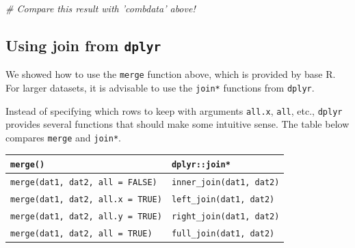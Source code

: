 \documentclass[]{book}
\newenvironment{Shaded}{\begin{snugshade}}{\end{snugshade}}
\newcommand{\CommentTok}[1]{\textcolor[rgb]{0.56,0.35,0.01}{\textit{#1}}}
\begin{document}
\begin{Shaded}
\begin{Highlighting}[]
\CommentTok{# Compare this result with 'combdata' above!}
\end{Highlighting}
\end{Shaded}

\hypertarget{using-join-from-dplyr}{%
\subsection{\texorpdfstring{Using join from \texttt{dplyr}}{Using join from dplyr}}\label{using-join-from-dplyr}}

We showed how to use the \texttt{merge} function above, which is provided by base R. For larger datasets, it is advisable to use the \texttt{join*} functions from \texttt{dplyr}.

Instead of specifying which rows to keep with arguments \texttt{all.x}, \texttt{all}, etc., \texttt{dplyr} provides several functions that should make some intuitive sense. The table below compares \texttt{merge} and \texttt{join*}.

\begin{longtable}[]{@{}ll@{}}
\toprule
\begin{minipage}[b]{0.48\columnwidth}\raggedright
\texttt{merge()}\strut
\end{minipage} & \begin{minipage}[b]{0.42\columnwidth}\raggedright
\texttt{dplyr::join*}\strut
\end{minipage}\tabularnewline
\midrule
\endhead
\begin{minipage}[t]{0.48\columnwidth}\raggedright
\texttt{merge(dat1,\ dat2,\ all\ =\ FALSE)}\strut
\end{minipage} & \begin{minipage}[t]{0.42\columnwidth}\raggedright
\texttt{inner\_join(dat1,\ dat2)}\strut
\end{minipage}\tabularnewline
\begin{minipage}[t]{0.48\columnwidth}\raggedright
\texttt{merge(dat1,\ dat2,\ all.x\ =\ TRUE)}\strut
\end{minipage} & \begin{minipage}[t]{0.42\columnwidth}\raggedright
\texttt{left\_join(dat1,\ dat2)}\strut
\end{minipage}\tabularnewline
\begin{minipage}[t]{0.48\columnwidth}\raggedright
\texttt{merge(dat1,\ dat2,\ all.y\ =\ TRUE)}\strut
\end{minipage} & \begin{minipage}[t]{0.42\columnwidth}\raggedright
\texttt{right\_join(dat1,\ dat2)}\strut
\end{minipage}\tabularnewline
\begin{minipage}[t]{0.48\columnwidth}\raggedright
\texttt{merge(dat1,\ dat2,\ all\ =\ TRUE)}\strut
\end{minipage} & \begin{minipage}[t]{0.42\columnwidth}\raggedright
\texttt{full\_join(dat1,\ dat2)}\strut
\end{minipage}\tabularnewline
\bottomrule
\end{longtable}
\end{document}
